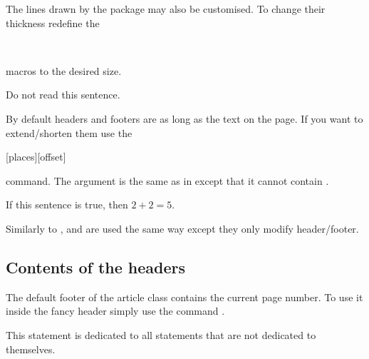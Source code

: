 The lines drawn by the  package may also be customised. To change
their thickness redefine the
\begin{lscommand}
   \\
\end{lscommand}
macros to the desired size.
\begin{example}[standalone, paperheight=3cm]
\geometry{includefoot, includehead, headsep=.5em, footskip=1em} %
\sloppy %
\usepackage{fancyhdr} %
\pagestyle{fancy} %
\RenewDocumentCommand{\headrulewidth}{}{.2cm}
\RenewDocumentCommand{\footrulewidth}{}{.5cm}

\noindent %
Do not read this sentence.
\end{example}

By default headers and footers are as long as the text on the page. If you want
to extend\slash{}shorten them use the
\begin{lscommand}
  [places][offset]
\end{lscommand}
command. The  argument is the same as in  except that
it cannot contain .
\begin{example}[standalone, paperheight=3cm]
\geometry{includehead, includefoot, headsep=.5em, footskip=1em} %
\sloppy %
\usepackage{fancyhdr}%
\pagestyle{fancy}%
\fancyhfoffset[L]{-1cm}
\fancyhfoffset[R]{.2cm}

\noindent %
If this sentence is true,
then \(2 + 2 = 5\).
\end{example}
Similarly to ,  and  are
used the same way except they only modify header\slash{}footer.

\subsection{Contents of the headers}

The default footer of the article class contains the current page number. To
use it inside the fancy header simply use the command .
\begin{example}[standalone, paperheight=2.5cm, to_page=2, vertical_pages]
\geometry{includehead, includefoot, headsep=.5em, footskip=1em} %
\sloppy %
\usepackage{fancyhdr}%
\pagestyle{fancy}%

\noindent %
This statement is dedicated to
all statements that are not
dedicated to themselves. 
\end{example}

